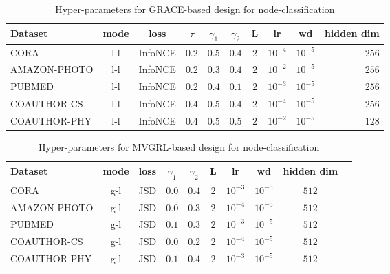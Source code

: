\documentclass{article}
\theoremstyle{plain}
\theoremstyle{definition}
\theoremstyle{remark}
\begin{document}
\begin{table}[H]
\centering
\caption{Hyper-parameters for GRACE-based design for node-classification}
\label{table:hp_grace}
\vskip 0.15in
\begin{center}
\begin{small}
\begin{sc}
\begin{tabular}{lccccccccr}
\toprule
Dataset & mode & loss & $\tau$ & $\gamma_1$ & $\gamma_2$ & L & lr & wd & hidden dim \\
\midrule
CORA & l-l & InfoNCE & $0.2$ & $0.5$ & $0.4$ & $2$ & $10^{-4}$ & $10^{-5}$ & $256$\\
AMAZON-PHOTO & l-l & InfoNCE & $0.2$ & $0.3$ & $0.4$ & $2$ & $10^{-2}$ & $10^{-5}$ & $256$\\ 
PUBMED & l-l & InfoNCE & $0.2$ & $0.4$ & $0.1$ & $2$ & $10^{-3}$ & $10^{-5}$ & $256$\\
COAUTHOR-CS & l-l & InfoNCE & $0.4$ & $0.5$ & $0.4$ & $2$ & $10^{-4}$ & $10^{-5}$ & $256$\\
COAUTHOR-PHY & l-l & InfoNCE & $0.4$ & $0.5$ & $0.5$ & $2$ & $10^{-2}$ & $10^{-5}$ & $128$\\
\bottomrule
\end{tabular}
\end{sc}
\end{small}
\end{center}
\vskip -0.1in
\end{table}

\begin{table}[H]
\centering
\caption{Hyper-parameters for MVGRL-based design for node-classification}
\label{table:hp_mvgrl}
\vskip 0.15in
\begin{center}
\begin{small}
\begin{sc}
\begin{tabular}{lccccccccr}
\toprule
Dataset & mode & loss & $\gamma_1$ & $\gamma_2$ & L & lr & wd & hidden dim \\
\midrule
CORA & g-l & JSD & $0.0$ & $0.4$ &  $2$ & $10^{-3}$ & $10^{-5}$ & $512$\\
AMAZON-PHOTO & g-l & JSD & $0.0$ & $0.3$ & $2$ & $10^{-4}$ & $10^{-5}$ & $512$\\
PUBMED & g-l & JSD & $0.1$ & $0.3$ & $2$ & $10^{-3}$ & $10^{-5}$ & $512$\\
COAUTHOR-CS & g-l & JSD & $0.0$ & $0.2$ & $2$ & $10^{-4}$ & $10^{-5}$ & $512$\\
COAUTHOR-PHY & g-l & JSD & $0.1$ & $0.4$ & $2$ & $10^{-3}$ & $10^{-5}$ & $512$\\
\bottomrule
\end{tabular}
\end{sc}
\end{small}
\end{center}
\vskip -0.1in
\end{table}
\end{document}
